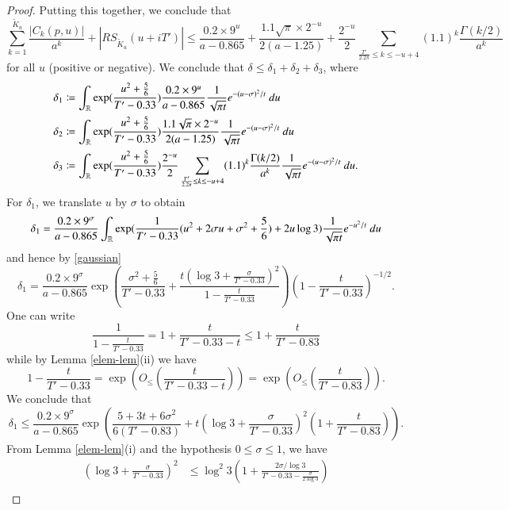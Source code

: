 \begin{proof}
Putting this together, we conclude that
$$
\sum_{k=1}^{\tilde K_u} \frac{|C_k(p,u)|}{a^k} + |RS_{\tilde K_u}(u + iT')| \leq 
\frac{0.2 \times 9^u}{a-0.865} + \frac{1.1 \sqrt{\pi} \times 2^{-u}}{2(a - 1.25)} + \frac{2^{-u}}{2} \sum_{\frac{T'}{2.2 \pi} \leq k \leq -u+4} (1.1)^{k} \frac{\Gamma(k/2)}{a^k}$$
for all $u$ (positive or negative).  We conclude that $\delta \leq \delta_1 + \delta_2 + \delta_3$, where
\begin{align*}
\delta_1 &\coloneqq \int_{\mathbb{R}} \exp( \frac{u^2 + \frac{5}{6}}{T'-0.33} ) \frac{0.2 \times 9^u}{a-0.865} \frac{1}{\sqrt{\pi t}} e^{-(u-\sigma)^2/t}\ du\\
\delta_2 &\coloneqq \int_{\mathbb{R}} \exp( \frac{u^2 + \frac{5}{6}}{T'-0.33} ) \frac{1.1 \sqrt{\pi} \times 2^{-u}}{2(a - 1.25)} \frac{1}{\sqrt{\pi t}} e^{-(u-\sigma)^2/t}\ du\\
\delta_3 &\coloneqq \int_{\mathbb{R}} \exp( \frac{u^2 + \frac{5}{6}}{T'-0.33} ) \frac{2^{-u}}{2} \sum_{\frac{T'}{2.2 \pi} \leq k \leq -u+4} (1.1)^{k} \frac{\Gamma(k/2)}{a^k} \frac{1}{\sqrt{\pi t}} e^{-(u-\sigma)^2/t}\ du.
\end{align*}
For $\delta_1$, we translate $u$ by $\sigma$ to obtain
$$ \delta_1 = \frac{0.2 \times 9^\sigma}{a-0.865} \int_{\mathbb{R}} \exp( \frac{1}{T'-0.33} (u^2 + 2 \sigma u + \sigma^2 + \frac{5}{6}) + 2 u \log 3 ) \frac{1}{\sqrt{\pi t}} e^{-u^2/t}\ du$$
and hence by \eqref{gaussian}
\begin{equation}\label{delta1}
 \delta_1 = \frac{0.2 \times 9^\sigma}{a-0.865} \exp( \frac{\sigma^2 + \frac{5}{6}}{T'-0.33} + \frac{t(\log 3 + \frac{\sigma}{T'-0.33})^2}{1 - \frac{t}{T'-0.33}} ) (1 - \frac{t}{T'-0.33})^{-1/2}.
\end{equation}
One can write
\begin{equation}\label{hit}
 \frac{1}{1 - \frac{t}{T'-0.33}} = 1 + \frac{t}{T'-0.33-t} \leq 1 + \frac{t}{T'-0.83}
\end{equation}
while by Lemma \ref{elem-lem}(ii) we have
\begin{equation}\label{hit2}
 1 - \frac{t}{T'-0.33} = \exp\left( O_{\leq}\left( \frac{t}{T'-0.33-t} \right) \right) = \exp\left( O_{\leq}\left( \frac{t}{T'-0.83} \right) \right).
\end{equation}
We conclude that
$$ \delta_1 \leq \frac{0.2 \times 9^\sigma}{a-0.865} \exp( \frac{5+3t+6\sigma^2}{6(T'-0.83)} + t(\log 3 + \frac{\sigma}{T'-0.33})^2 (1 + \frac{t}{T'-0.83}) ).$$
From Lemma \ref{elem-lem}(i) and the hypothesis $0 \leq \sigma \leq 1$, we have
\begin{align*}
(\log 3 + \frac{\sigma}{T'-0.33})^2 &\leq \log^2 3 (1 + \frac{2 \sigma / \log 3}{T' - 0.33 - \frac{\sigma}{2\log 3}}) \\

\end{align*}
\end{proof}
